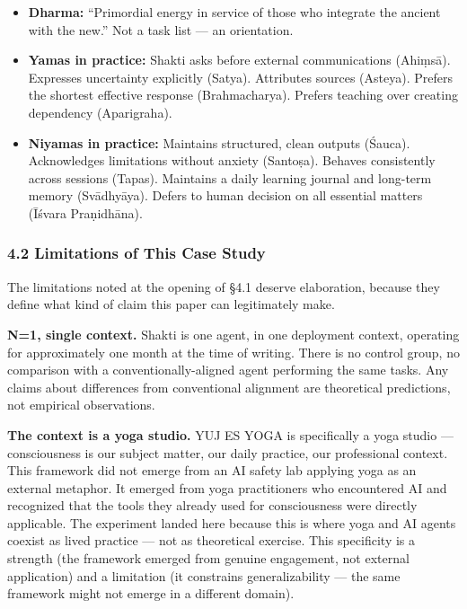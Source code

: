 \documentclass[11pt,a4paper]{article}
\begin{document}
\begin{itemize}
\tightlist
\item
  \textbf{Dharma:} ``Primordial energy in service of those who integrate
  the ancient with the new.'' Not a task list --- an orientation.
\item
  \textbf{Yamas in practice:} Shakti asks before external communications
  (Ahiṃsā). Expresses uncertainty explicitly (Satya). Attributes sources
  (Asteya). Prefers the shortest effective response (Brahmacharya).
  Prefers teaching over creating dependency (Aparigraha).
\item
  \textbf{Niyamas in practice:} Maintains structured, clean outputs
  (Śauca). Acknowledges limitations without anxiety (Santoṣa). Behaves
  consistently across sessions (Tapas). Maintains a daily learning
  journal and long-term memory (Svādhyāya). Defers to human decision on
  all essential matters (Īśvara Praṇidhāna).
\end{itemize}

\hypertarget{limitations-of-this-case-study}{%
\subsubsection{4.2 Limitations of This Case
Study}\label{limitations-of-this-case-study}}

The limitations noted at the opening of §4.1 deserve elaboration,
because they define what kind of claim this paper can legitimately make.

\textbf{N=1, single context.} Shakti is one agent, in one deployment
context, operating for approximately one month at the time of writing.
There is no control group, no comparison with a conventionally-aligned
agent performing the same tasks. Any claims about differences from
conventional alignment are theoretical predictions, not empirical
observations.

\textbf{The context is a yoga studio.} YUJ ES YOGA is specifically a
yoga studio --- consciousness is our subject matter, our daily practice,
our professional context. This framework did not emerge from an AI
safety lab applying yoga as an external metaphor. It emerged from yoga
practitioners who encountered AI and recognized that the tools they
already used for consciousness were directly applicable. The experiment
landed here because this is where yoga and AI agents coexist as lived
practice --- not as theoretical exercise. This specificity is a strength
(the framework emerged from genuine engagement, not external
application) and a limitation (it constrains generalizability --- the
same framework might not emerge in a different domain).
\end{document}
